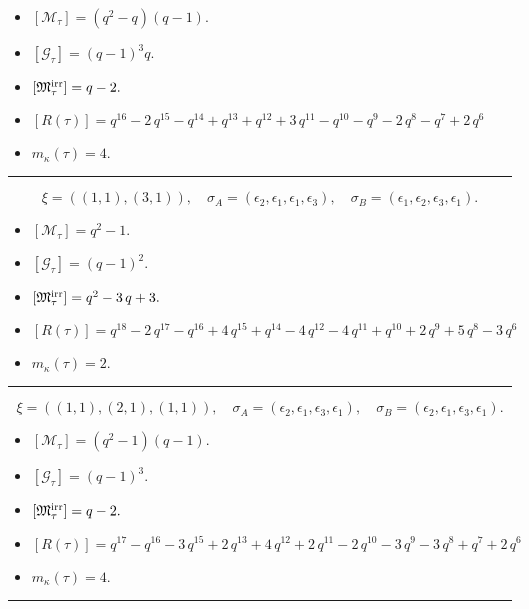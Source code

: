 \documentclass[10pt,a4paper]{amsart}
\begin{document}
\begin{itemize}
 \item $[\mathcal{M}_{\tau}] = {\left(q^{2} - q\right)} {\left(q - 1\right)} .$

 \item $[\mathcal{G}_{\tau}] = {\left(q - 1\right)}^{3} q .$

 \item $[{\frak M}_{\tau}^{\textrm{irr}}] = q - 2 .$

 \item $[R(\tau)] = q^{16} - 2 \, q^{15} - q^{14} + q^{13} + q^{12} + 3 \, q^{11} - q^{10} - q^{9} - 2 \, q^{8} - q^{7} + 2 \, q^{6} $

 \item $m_{\kappa}(\tau) = 4 .$

 \end{itemize}
\noindent\rule{8cm}{0.4pt}

$$\xi = ({(1, 1)}, {(3, 1)}),\quad \sigma_A = ({{\epsilon_2}}, {{\epsilon_1, \epsilon_1, \epsilon_3}}),\quad \sigma_B = ({{\epsilon_1}}, {{\epsilon_2, \epsilon_3, \epsilon_1}}).$$

\begin{itemize}
 \item $[\mathcal{M}_{\tau}] = q^{2} - 1 .$

 \item $[\mathcal{G}_{\tau}] = {\left(q - 1\right)}^{2} .$

 \item $[{\frak M}_{\tau}^{\textrm{irr}}] = q^{2} - 3 \, q + 3 .$

 \item $[R(\tau)] = q^{18} - 2 \, q^{17} - q^{16} + 4 \, q^{15} + q^{14} - 4 \, q^{12} - 4 \, q^{11} + q^{10} + 2 \, q^{9} + 5 \, q^{8} - 3 \, q^{6} $

 \item $m_{\kappa}(\tau) = 2 .$

 \end{itemize}
\noindent\rule{8cm}{0.4pt}

$$\xi = ({(1, 1)}, {(2, 1), (1, 1)}),\quad \sigma_A = ({{\epsilon_2}}, {{\epsilon_1, \epsilon_3}, {\epsilon_1}}),\quad \sigma_B = ({{\epsilon_2}}, {{\epsilon_1, \epsilon_3}, {\epsilon_1}}).$$

\begin{itemize}
 \item $[\mathcal{M}_{\tau}] = {\left(q^{2} - 1\right)} {\left(q - 1\right)} .$

 \item $[\mathcal{G}_{\tau}] = {\left(q - 1\right)}^{3} .$

 \item $[{\frak M}_{\tau}^{\textrm{irr}}] = q - 2 .$

 \item $[R(\tau)] = q^{17} - q^{16} - 3 \, q^{15} + 2 \, q^{13} + 4 \, q^{12} + 2 \, q^{11} - 2 \, q^{10} - 3 \, q^{9} - 3 \, q^{8} + q^{7} + 2 \, q^{6} $

 \item $m_{\kappa}(\tau) = 4 .$

 \end{itemize}
\noindent\rule{8cm}{0.4pt}
\end{document}
